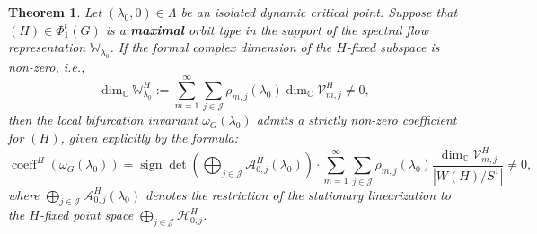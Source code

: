 \documentclass[twoside,11pt]{article}
\def\bc{{\mathbb{C}}}
\newtheorem{theorem}{Theorem}[section]
\begin{document}
\begin{theorem}\label{thm:generalized_guarantee}
Let $(\lambda_0,0) \in \Lambda$ be an isolated dynamic critical point. Suppose that $(H) \in \Phi_1^t(G)$ is a \textbf{maximal} orbit type in the support of the spectral flow representation $\mathbb{W}_{\lambda_0}$. If the formal complex dimension of the $H$-fixed subspace is non-zero, i.e.,
\begin{equation*} %
\dim_\bc \mathbb{W}_{\lambda_0}^H := \sum_{m=1}^\infty \sum_{j \in \mathcal{J}} \rho_{m,j}(\lambda_0) \dim_\bc \mathcal{V}_{m,j}^H \neq 0,
\end{equation*}
then the local bifurcation invariant $\omega_G(\lambda_0)$ admits a strictly non-zero coefficient for $(H)$, given explicitly by the formula:
\begin{equation} \label{eq:universal_formula}
\operatorname{coeff}^H(\omega_{G}(\lambda_0)) = \operatorname{sign}\det\left(\bigoplus_{j \in \mathcal J} \mathscr{A}_{0,j}^H(\lambda_0)\right) \cdot \sum_{m=1}^\infty \sum_{j \in \mathcal{J}} \rho_{m,j}(\lambda_0) \frac{\dim_\bc \mathcal{V}_{m,j}^H}{|W(H)/S^1|} \neq 0,
\end{equation}
where $\bigoplus_{j \in \mathcal J} \mathscr{A}_{0,j}^H(\lambda_0)$ denotes the restriction of the stationary linearization to the $H$-fixed point space $\bigoplus_{j \in \mathcal J}\mathscr H_{0,j}^H$.
\end{theorem}
\end{document}
